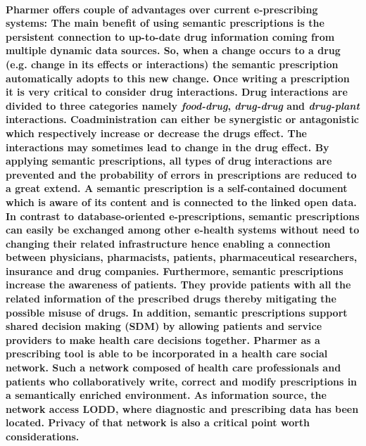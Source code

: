 \documentclass[journal]{IEEEtran}
\begin{document}
\paragraph{Pharmer offers couple of advantages over current e-prescribing systems:
The main benefit of using semantic prescriptions is the persistent connection to up-to-date drug information coming from multiple dynamic data sources.
So, when a change occurs to a drug (e.g. change in its effects or interactions) the semantic prescription automatically adopts to this new change.
Once writing a prescription it is very critical to consider drug interactions.
Drug interactions are divided to three categories namely \emph{food-drug}, \emph{drug-drug} and \emph{drug-plant} interactions.
Coadministration can either be synergistic or antagonistic which respectively increase or decrease the drugs effect.
The interactions may sometimes lead to change in the drug effect.
By applying semantic prescriptions, all types of drug interactions are prevented and the probability of errors in prescriptions are reduced to a great extend.
A semantic prescription is a self-contained document which is aware of its content and is connected to the linked open data.
In contrast to database-oriented e-prescriptions, semantic prescriptions can easily be exchanged among other e-health systems without need to changing their related infrastructure hence enabling a connection between physicians, pharmacists, patients, pharmaceutical researchers, insurance and drug companies.
Furthermore, semantic prescriptions increase the awareness of patients.
They provide patients with all the related information of the prescribed drugs thereby mitigating the possible misuse of drugs.
In addition, semantic prescriptions support shared decision making (SDM) by allowing patients and service providers to make health care decisions together.
Pharmer as a prescribing tool is able to be incorporated in a health care social network.
Such a network composed of health care professionals and patients who collaboratively write, correct and modify prescriptions in a semantically enriched environment.
As information source, the network access LODD, where diagnostic and prescribing data has been located.
Privacy of that network is also a critical point worth considerations.
}
\end{document}
